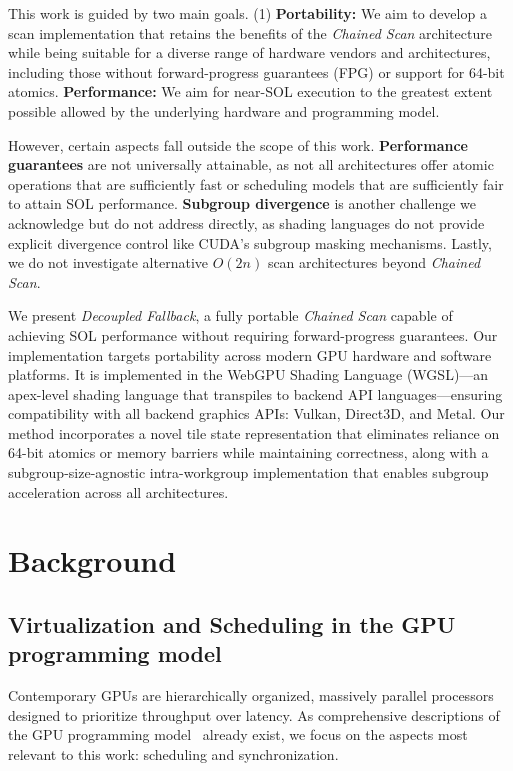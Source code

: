 \documentclass[acmsmall, manuscript, screen, review, anonymous]{acmart}
\begin{document}
This work is guided by two main goals. (1) \textbf{Portability:} We aim to develop a scan implementation that retains the benefits of the \emph{Chained Scan} architecture while being suitable for a diverse range of hardware vendors and architectures, including those without forward-progress guarantees (FPG) or support for 64-bit atomics. \textbf{Performance:} We aim for near-SOL execution to the greatest extent possible allowed by the underlying hardware and programming model.

However, certain aspects fall outside the scope of this work. \textbf{Performance guarantees} are not universally attainable, as not all architectures offer atomic operations that are sufficiently fast or scheduling models that are sufficiently fair to attain SOL performance. \textbf{Subgroup divergence} is another challenge we acknowledge but do not address directly, as shading languages do not provide explicit divergence control like CUDA's subgroup masking mechanisms. Lastly, we do not investigate alternative $O(2n)$ scan architectures beyond \emph{Chained Scan}.

We present \emph{Decoupled Fallback}, a fully portable \emph{Chained Scan} capable of achieving SOL performance without requiring forward-progress guarantees. Our implementation targets portability across modern GPU hardware and software platforms. It is implemented in the WebGPU Shading Language (WGSL)---an apex-level shading language that transpiles to backend API languages---ensuring compatibility with all backend graphics APIs: Vulkan, Direct3D, and Metal. Our method incorporates a novel tile state representation that eliminates reliance on 64-bit atomics or memory barriers while maintaining correctness, along with a subgroup-size-agnostic intra-workgroup implementation that enables subgroup acceleration across all architectures.

\section{Background}
\subsection{Virtualization and Scheduling in the GPU programming model}
Contemporary GPUs are hierarchically organized, massively parallel processors designed to prioritize throughput over latency. As comprehensive descriptions of the GPU programming model~\cite{10.1145/1365490.1365500} already exist, we focus on the aspects most relevant to this work: scheduling and synchronization.
\end{document}
